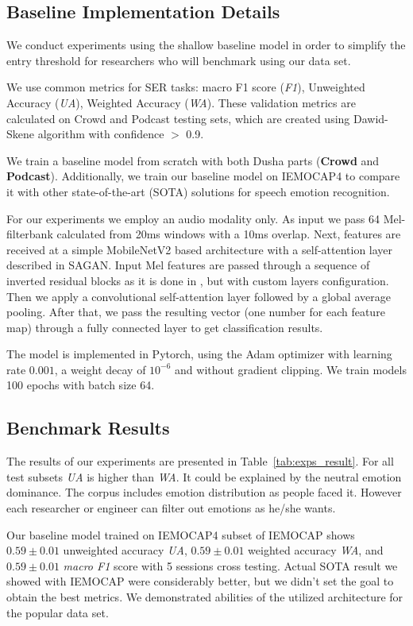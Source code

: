 \documentclass{article}
\begin{document}
\subsection{Baseline Implementation Details}
We conduct experiments using the shallow baseline model in order to simplify the entry threshold for researchers who will benchmark using our data set.

We use common metrics for SER tasks: macro F1 score (\textit{F1}), Unweighted Accuracy (\textit{UA}), Weighted Accuracy (\textit{WA}). These validation metrics are calculated on Crowd and Podcast testing sets, which are created using Dawid-Skene algorithm with confidence $>$ 0.9. 

We train a baseline model from scratch with both Dusha parts (\textbf{Crowd} and \textbf{Podcast}). 
Additionally, we train our baseline model on IEMOCAP4 to compare it with other state-of-the-art (SOTA) solutions for speech emotion recognition.

For our experiments we employ an audio modality only. 
As input we pass 64 Mel-filterbank calculated from 20ms windows with a 10ms overlap. 
Next, features are received at a simple MobileNetV2\cite{mobilenetv2} based architecture with a self-attention layer described in SAGAN\cite{zhang2019self}. 
Input Mel features are passed through a sequence of inverted residual blocks as it is done in \cite{mobilenetv2}, but with custom layers configuration.
Then we apply a convolutional self-attention layer followed by a global average pooling.
After that, we pass the resulting vector (one number for each feature map) through a fully connected layer to get classification results.

The model is implemented in Pytorch, using the Adam\cite{adam} optimizer with learning rate $0.001$, a weight decay of $10^{-6}$ and without gradient clipping. We train models 100 epochs with batch size 64.

\subsection{Benchmark Results}
The results of our experiments are presented in Table~\ref{tab:exps_result}. For all test subsets \textit{UA} is higher than \textit{WA}. It could be explained by the neutral emotion dominance. The corpus includes emotion distribution as people faced it. However each researcher or engineer can filter out emotions as he/she wants.

Our baseline model trained on IEMOCAP4 subset of IEMOCAP shows $0.59 \pm 0.01$ unweighted accuracy \textit{UA}, $0.59 \pm 0.01$ weighted accuracy \textit{WA}, and $0.59 \pm 0.01$ \textit{macro F1} score with 5 sessions cross testing. Actual SOTA result we showed with IEMOCAP were considerably better, but we didn't set the goal to obtain the best metrics. We demonstrated abilities of the utilized architecture for the popular data set.
\end{document}
